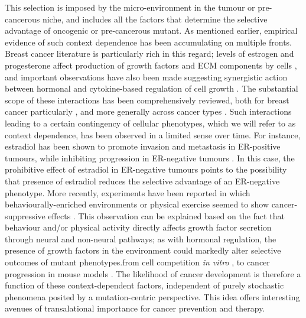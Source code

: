 \documentclass[9pt,twocolumn,twoside]{pnas-new}
\begin{document}
This selection is imposed by the micro-environment in the tumour or pre-cancerous niche, and includes all the factors that determine the selective advantage of oncogenic or pre-cancerous mutant. As mentioned earlier, empirical evidence of such context dependence has been accumulating on multiple fronts. Breast cancer literature is particularly rich in this regard; levels of estrogen and progesterone affect production of growth factors and ECM components by cells \cite{Haslam2001,Woodward2000,DICKSON1987}, and important observations have also been made suggesting synergistic action between hormonal and cytokine-based regulation of cell growth \cite{Freund2003}. The substantial scope of these interactions has been comprehensively reviewed, both for breast cancer particularly \cite{Hansen2000}, and more generally across cancer types \cite{Pietras2010,Hanahan2012,Cabarcas2011a}. Such interactions leading to a certain contingency of cellular phenotypes, which we will refer to as context dependence, has been observed in a limited sense over time. For instance, estradiol has been shown to promote invasion and metastasis in ER-positive tumours, while inhibiting progression in ER-negative tumours \cite{Garcia1992}. In this case, the prohibitive effect of estradiol in ER-negative tumours points to the possibility that presence of estradiol reduces the selective advantage of an ER-negative phenotype. More recently, experiments have been reported in which behaviourally-enriched environments or physical exercise seemed to show cancer-suppressive effects \cite{Cao2010,Rundqvist2013}. This observation can be explained based on the fact that behaviour and/or physical activity directly affects growth factor secretion through neural and non-neural pathways; as with hormonal regulation, the presence of growth factors in the environment could markedly alter selective outcomes of mutant phenotypes.from cell competition \textit{in vitro} \cite{Archetti2015}, to cancer progression in mouse models \cite{Cao2010}. The likelihood of cancer development is therefore a function of these context-dependent factors, independent of purely stochastic phenomena posited by a mutation-centric perspective. This idea offers interesting avenues of transalational importance for cancer prevention and therapy.
\end{document}
